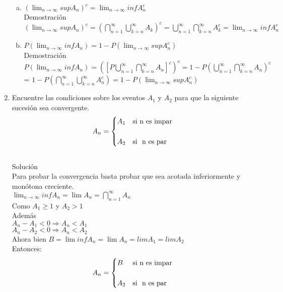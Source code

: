 \documentclass[12pt]{article}
\begin{document}
\begin{enumerate}
\begin{enumerate}[a)]
\item $\left(\displaystyle\lim_{n\longrightarrow \infty}{sup}A_n\right)^c =\displaystyle\lim_{n\longrightarrow \infty} {inf}{A_n^c} $\\[0.2cm]
Demostración\\[0.2cm]
$\left(\displaystyle\lim_{n\longrightarrow \infty}{sup}A_n\right)^c =\left(\displaystyle\bigcap_{n=1}^{\infty}\displaystyle\bigcup_{k=n}^{\infty}{A_k}\right)^c =\displaystyle\bigcup_{n=1}^{\infty}\displaystyle\bigcap_{k=n}^{\infty}{A_k^c} = \displaystyle\lim_{n\longrightarrow \infty} {inf}{A_n^c} $

\item $P\left(\displaystyle\lim_{n\longrightarrow \infty}{inf}A_n\right) =1-P\left(\displaystyle\lim_{n\longrightarrow \infty}{sup}A_n^c\right)$\\[0.2cm]
Demostración\\[0.2cm]
 $P\left(\displaystyle\lim_{n\longrightarrow \infty}{inf}A_n\right)=\left([P\displaystyle\bigcup_{n=1}^{\infty}\displaystyle\bigcap_{k=n}^{\infty}{A_n}]^c\right)^c = 1-P\left(\displaystyle\bigcup_{n=1}^{\infty}\displaystyle\bigcap_{k=n}^{\infty}{A_n}\right)^c  $\\[0.2cm]
 = $ 1-P\left(\displaystyle\bigcap_{n=1}^{\infty}\displaystyle\bigcup_{k=n}^{\infty}{A_n^c}\right)= 1-P\left(\displaystyle\lim_{n\longrightarrow \infty}{sup}A_n^c\right) $
 

\end{enumerate}

\item Encuentre las condiciones sobre los eventos $A_1$ y $A_2$ para que la siguiente sucesión sea convergente.
\[A_n = \begin{cases} 
     A_1  & \mbox{si } $n es impar$   \\[0.5cm]
      A_2  & \mbox{si }$ n es par$
 \end{cases} \]\\
 Solución\\[0.2cm]
 Para probar la convergencia basta probar que sea acotada inferiormente y monótona creciente.\\[0.2cm]
 $\displaystyle\lim_{n\longrightarrow \infty}{inf}A_n = \lim A_n = \displaystyle\bigcap_{n=1}^{\infty}A_n$\\[0.2cm]
 Como $A_1 \geqslant 1 $ y $ A_2>1$\\[0.2cm]
 Además\\[0.2cm]
 $A_n - A_1 < 0 \Rightarrow A_n < A_1$ \\[0.2cm]
 $A_n - A_2 < 0 \Rightarrow A_n < A_2$\\[0.2cm]
Ahora bien $B = \lim{inf}A_n = \lim A_n = lim A_1= lim A_2$\\[0.2cm]
Entonces:\\[0.2cm]
\[A_n = \begin{cases} 
     B & \mbox{si } $n es impar$   \\[0.5cm]
      A_2  & \mbox{si }$ n es par$
 \end{cases} \]


\end{enumerate}
\end{document}
